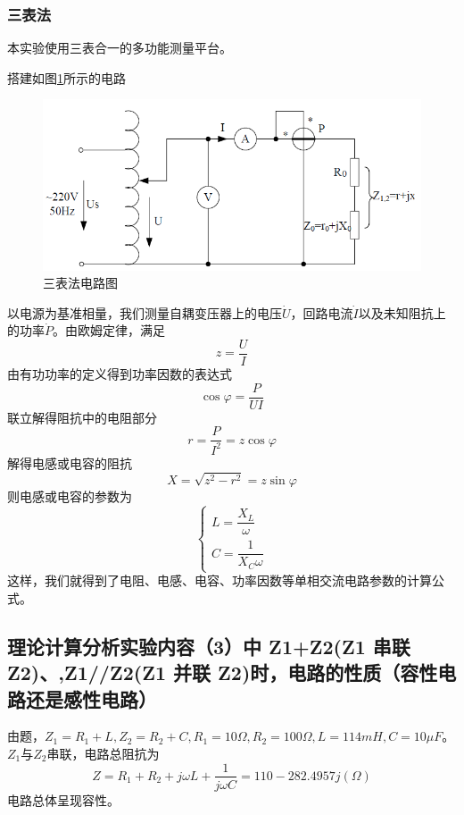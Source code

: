 \documentclass{ctexart}
\begin{document}
\subsubsection{三表法}
本实验使用三表合一的多功能测量平台。

搭建如图\ref{fig:三表法电路图}所示的电路
\begin{figure}[!ht]
    \centering
    \includegraphics{pic/三表法电路图.png}
    \caption{三表法电路图}
    \label{fig:三表法电路图}
\end{figure}
以电源为基准相量，我们测量自耦变压器上的电压$\Dot{U}$，回路电流$\Dot{I}$以及未知阻抗上的功率$\Dot{P}$。由欧姆定律，满足
\begin{equation}
    z=\dfrac{U}{I}
\end{equation}
由有功功率的定义得到功率因数的表达式
\begin{equation}
    \cos \varphi =\dfrac{P}{UI}
\end{equation}
联立解得阻抗中的电阻部分
\begin{equation}
    r=\dfrac{P}{I^2}=z\cos \varphi
\end{equation}
解得电感或电容的阻抗
\begin{equation}
    X=\sqrt{z^2-r^2}=z\sin \varphi
\end{equation}
则电感或电容的参数为
\begin{equation}
    \begin{cases}
        L=\dfrac{X_L}{\omega}\\
        C=\dfrac{1}{X_C \omega}
    \end{cases}
\end{equation}
这样，我们就得到了电阻、电感、电容、功率因数等单相交流电路参数的计算公式。
\subsection{理论计算分析实验内容（3）中 Z1+Z2(Z1 串联 Z2)、,Z1//Z2(Z1 并联 Z2)时，电路的性质（容性电路还是感性电路）}
由题，$Z_1=R_1+L,Z_2=R_2+C,R_1=10\Omega,R_2=100\Omega,L=114mH,C=10\mu F$。$Z_1$与$Z_2$串联，电路总阻抗为
\begin{equation}
    Z=R_1+R_2+j\omega L+\dfrac{1}{j \omega C}=110-282.4957j(\Omega)
\end{equation}
电路总体呈现容性。
\end{document}
